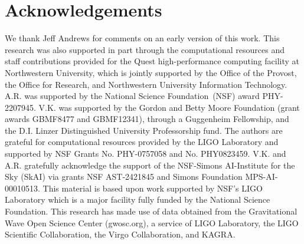 \documentclass[modern]{aastex631}
\newcommand{\todo}[1]{\textcolor{red}{TODO: #1}}
\begin{document}

\label{sec:conclusion}
\section{Acknowledgements}
\begin{acknowledgments}
    We thank Jeff Andrews for comments on an early version of this work. This research was also supported in part through the computational resources and staff contributions provided for the Quest high-performance computing facility at Northwestern University, which is jointly supported by the Office of the Provost, the Office for Research, and Northwestern University Information Technology. A.R. was supported by the National Science Foundation~(NSF) award PHY-2207945. V.K. was supported by the Gordon and Betty Moore Foundation (grant awards GBMF8477 and GBMF12341), through a Guggenheim Fellowship, and the D.I. Linzer Distinguished University Professorship fund. The authors are grateful for computational resources provided by the LIGO Laboratory and supported by NSF Grants No. PHY-0757058 and No. PHY0823459. V.K. and A.R. gratefully acknowledge the support of the NSF-Simons AI-Institute for the Sky (SkAI) via grants NSF AST-2421845 and Simons Foundation MPS-AI-00010513. This material is based upon work supported by NSF’s LIGO Laboratory which is a major facility fully funded by the National Science Foundation. This research has made use of data obtained from the Gravitational Wave Open Science Center (gwosc.org), a service of LIGO Laboratory, the LIGO Scientific Collaboration, the Virgo Collaboration, and KAGRA. 
\end{acknowledgments}


\clearpage


\end{document}
